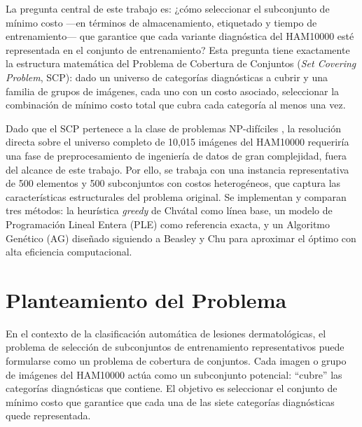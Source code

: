 \documentclass[conference]{IEEEtran}
\begin{document}
La pregunta central de este trabajo es: ¿cómo seleccionar el subconjunto de mínimo costo —en términos de almacenamiento, etiquetado y tiempo de entrenamiento— que garantice que cada variante diagnóstica del HAM10000 esté representada en el conjunto de entrenamiento? Esta pregunta tiene exactamente la estructura matemática del Problema de Cobertura de Conjuntos (\textit{Set Covering Problem}, SCP): dado un universo de categorías diagnósticas a cubrir y una familia de grupos de imágenes, cada uno con un costo asociado, seleccionar la combinación de mínimo costo total que cubra cada categoría al menos una vez.

Dado que el SCP pertenece a la clase de problemas NP-difíciles \cite{karp1972, garey1979}, la resolución directa sobre el universo completo de 10,015 imágenes del HAM10000 requeriría una fase de preprocesamiento de ingeniería de datos de gran complejidad, fuera del alcance de este trabajo. Por ello, se trabaja con una instancia representativa de 500 elementos y 500 subconjuntos con costos heterogéneos, que captura las características estructurales del problema original. Se implementan y comparan tres métodos: la heurística \textit{greedy} de Chvátal \cite{chvatal1979} como línea base, un modelo de Programación Lineal Entera (PLE) como referencia exacta, y un Algoritmo Genético (AG) diseñado siguiendo a Beasley y Chu \cite{beasley1996} para aproximar el óptimo con alta eficiencia computacional.

\section{Planteamiento del Problema}

En el contexto de la clasificación automática de lesiones dermatológicas, el problema de selección de subconjuntos de entrenamiento representativos puede formularse como un problema de cobertura de conjuntos. Cada imagen o grupo de imágenes del HAM10000 actúa como un subconjunto potencial: ``cubre'' las categorías diagnósticas que contiene. El objetivo es seleccionar el conjunto de mínimo costo que garantice que cada una de las siete categorías diagnósticas quede representada.
\end{document}
